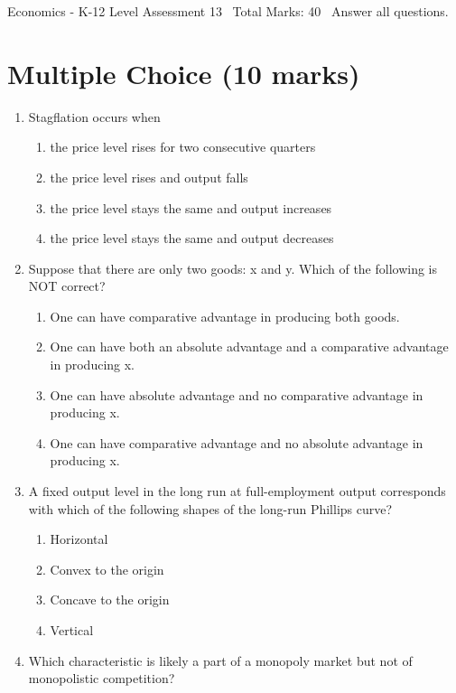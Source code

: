 \documentclass[12pt]{article}
\begin{document}
\begin{center}
Economics - K-12 Level Assessment 13 \
Total Marks: 40 \
Answer all questions.
\end{center}

\section*{Multiple Choice (10 marks)}
\begin{enumerate}[label=\arabic*.]
\item Stagflation occurs when
\begin{enumerate}[label=(\alph*)]
    \item the price level rises for two consecutive quarters
    \item the price level rises and output falls
    \item the price level stays the same and output increases
    \item the price level stays the same and output decreases
\end{enumerate}
\item Suppose that there are only two goods: x and y. Which of the following is NOT correct?
\begin{enumerate}[label=(\alph*)]
    \item One can have comparative advantage in producing both goods.
    \item One can have both an absolute advantage and a comparative advantage in producing x.
    \item One can have absolute advantage and no comparative advantage in producing x.
    \item One can have comparative advantage and no absolute advantage in producing x.
\end{enumerate}
\item A fixed output level in the long run at full-employment output corresponds with which of the following shapes of the long-run Phillips curve?
\begin{enumerate}[label=(\alph*)]
    \item Horizontal
    \item Convex to the origin
    \item Concave to the origin
    \item Vertical
\end{enumerate}
\item Which characteristic is likely a part of a monopoly market but not of monopolistic competition?
\begin{enumerate}[label=(\alph*)]

\end{enumerate}
\end{enumerate}
\end{document}
